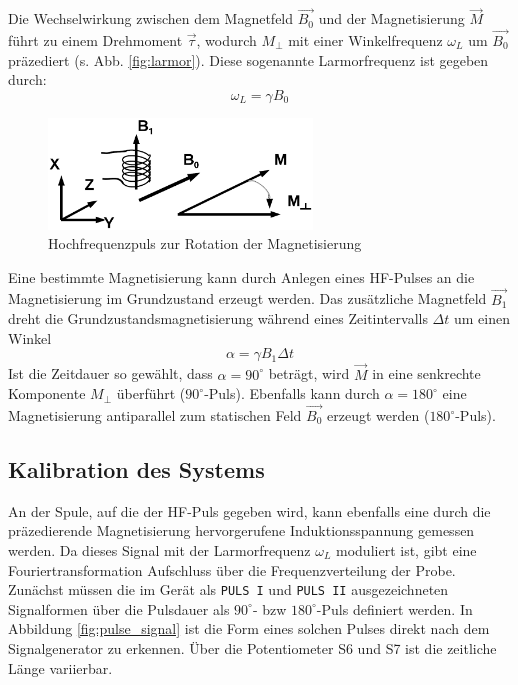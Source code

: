 \documentclass[a4paper]{scrartcl} %
\begin{document}
Die Wechselwirkung zwischen dem Magnetfeld $\vec{B_0}$ und der Magnetisierung $\vec{M}$ führt zu einem Drehmoment $\vec{\tau}$, wodurch $M_{\perp}$ mit einer Winkelfrequenz $\omega_{L}$ um $\vec{B_0}$ präzediert (s. Abb. \ref{fig:larmor}). Diese sogenannte Larmorfrequenz ist gegeben durch:
\begin{equation}
\omega_{L} = \gamma B_0
\label{eq:larmor_freq}
\end{equation}
\begin{figure}[H]
	\centering
	\includegraphics[width=70mm]{./Resources/hf_pulse.png}
	\caption{Hochfrequenzpuls zur Rotation der Magnetisierung \autocite{skript}}
\end{figure}
Eine bestimmte Magnetisierung kann durch Anlegen eines HF-Pulses an die Magnetisierung im Grundzustand erzeugt werden. Das zusätzliche Magnetfeld $\vec{B_1}$ dreht die Grundzustandsmagnetisierung während eines Zeitintervalls $\Delta t$ um einen Winkel
\begin{equation}
\alpha = \gamma B_1 \Delta t
\end{equation}
Ist die Zeitdauer so gewählt, dass $\alpha = 90^\circ$ beträgt, wird $\vec{M}$ in eine senkrechte Komponente $M_{\perp}$ überführt ($90^\circ$-Puls). Ebenfalls kann durch $\alpha = 180^\circ$ eine Magnetisierung antiparallel zum statischen Feld $\vec{B_0}$ erzeugt werden ($180^\circ$-Puls).

\subsection{Kalibration des Systems}

An der Spule, auf die der HF-Puls gegeben wird, kann ebenfalls eine durch die präzedierende Magnetisierung hervorgerufene Induktionsspannung gemessen werden. Da dieses Signal mit der Larmorfrequenz $\omega_L$ moduliert ist, gibt eine Fouriertransformation Aufschluss über die Frequenzverteilung der Probe.
\newline\newline
Zunächst müssen die im Gerät als \texttt{PULS I} und \texttt{PULS II} ausgezeichneten Signalformen über die Pulsdauer als $90^\circ$- bzw $180^\circ$-Puls definiert werden. In Abbildung \ref{fig:pulse_signal} ist die Form eines solchen Pulses direkt nach dem Signalgenerator zu erkennen. Über die Potentiometer S6 und S7 ist die zeitliche Länge variierbar.
\end{document}
